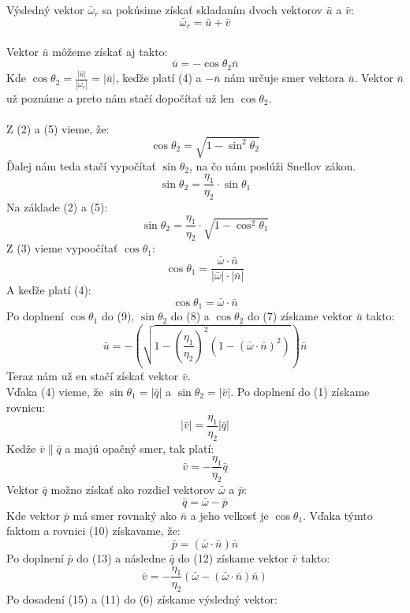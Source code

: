 \documentclass[slovak]{scrartcl}
\begin{document}
Výsledný vektor $\bar{\omega}_{r}$ sa pokúsime získať skladaním dvoch vektorov $\bar{u}$ a $\bar{v}$: \\
\begin{equation} \bar{\omega}_{r} = \bar{u} +  \bar{v} \end{equation}
\\
Vektor $\bar{u}$ môžeme získať aj takto:
\begin{equation} \bar{u} = -\cos\theta_{2}\bar{n} \end{equation}
Kde $\cos\theta_{2} = \frac{|\bar{u}|}{|\bar{\omega_{r}}|} = |\bar{u}|$, keďže platí (4) a $-\bar{n}$ nám určuje smer vektora $\bar{u}$. Vektor $\bar{n}$ už poznáme a preto nám stačí dopočítať už len $\cos\theta_{2}$.\\
\\
Z (2) a (5) vieme, že: \begin{equation} \cos\theta_{2} = \sqrt{1 - \sin^{2}\theta_{2}} \end{equation}
Ďalej nám teda stačí vypočítať $\sin\theta_{2}$, na čo nám poslúži Snellov zákon.
\[ \sin\theta_{2} = \frac{\eta_{1}}{\eta_{2}}\cdot\sin\theta_{1}  \]
Na základe (2) a (5):
\begin{equation} \sin\theta_{2} = \frac{\eta_{1}}{\eta_{2}}\cdot\sqrt{1 - \cos^2\theta_{1}}  \end{equation}
Z (3) vieme vypoočítať $\cos\theta_{1}$:
\[ \cos\theta_{1} =   \frac{\bar{\omega}\cdot\bar{n}}{|\bar{\omega}|\cdot|\bar{n}|}\]
A keďže platí (4):
\begin{equation} \cos\theta_{1} = \bar{\omega}\cdot\bar{n} \end{equation}
Po doplnení $\cos\theta_{1}$ do (9), $\sin\theta_{2}$ do (8) a $\cos\theta_{2}$ do (7) získame vektor $\bar{u}$ takto:
\begin{equation}
 \bar{u} = -\left(\sqrt{1 - \left(\frac{\eta_{1}}{\eta_{2}}\right)^{2}(1 - (\bar{\omega}\cdot\bar{n})^2 )}\right)\bar{n}
\end{equation}
Teraz nám už en stačí získať vektor $\bar{v}$.\\
Vďaka (4) vieme, že $\sin\theta_{1} = |\bar{q}|$ a $\sin\theta_{2} = |\bar{v}|$. Po doplnení do (1) získame rovnicu:
\[|\bar{v}| = \frac{\eta_{1}}{\eta_{2}}|\bar{q}|\]
Kedže  $\bar{v} \parallel \bar{q}$ a majú opačný smer, tak platí:
\begin{equation}\bar{v} = 
-\frac{\eta_{1}}{\eta_{2}}\bar{q}\end{equation}
Vektor $\bar{q}$ možno získať ako rozdiel vektorov $\bar{\omega}$ a $\bar{p}$:
\begin{equation}\bar{q} = \bar{\omega} - \bar{p}\end{equation}
Kde vektor $\bar{p}$ má smer rovnaký ako $\bar{n}$ a jeho velkosť je $\cos\theta_{1}$. Vďaka týmto faktom a rovnici (10) získavame, že:
\begin{equation}\bar{p} = (\bar{\omega}\cdot\bar{n})\bar{n} 
\end{equation}
Po doplnení $\bar{p}$ do (13) a následne $\bar{q}$ do (12) získame vektor $\bar{v}$ takto:
\begin{equation}\bar{v} = -\frac{\eta_{1}}{\eta_{2}}(\bar{\omega} - (\bar{\omega}\cdot\bar{n})\bar{n})\end{equation}
Po dosadení (15) a (11) do (6) získame výsledný vektor:
\end{document}

